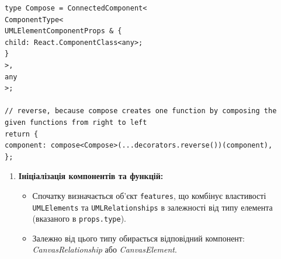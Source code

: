 \documentclass[oneside,14pt]{extarticle}
\begin{document}
\begin{normalsize}
\begin{small}
\begin{lstlisting}
type Compose = ConnectedComponent<
ComponentType<
UMLElementComponentProps & {
child: React.ComponentClass<any>;
}
>,
any
>;

// reverse, because compose creates one function by composing the given functions from right to left
return {
component: compose<Compose>(...decorators.reverse())(component),
};
    	\end{lstlisting}
    \end{small}
    
    
    \begin{enumerate}
    	\item \textbf{Ініціалізація компонентів та функцій:}
    	\begin{itemize}
    		\item Спочатку визначається об'єкт \texttt{features}, що комбінує властивості \texttt{UMLElements} та \texttt{UMLRelationships} в залежності від типу елемента (вказаного в \texttt{props.type}).
    		\item Залежно від цього типу обирається відповідний компонент: \textit{CanvasRelationship} або \textit{CanvasElement}.
    	\end{itemize}
    	

\end{enumerate}
\end{normalsize}
\end{document}
